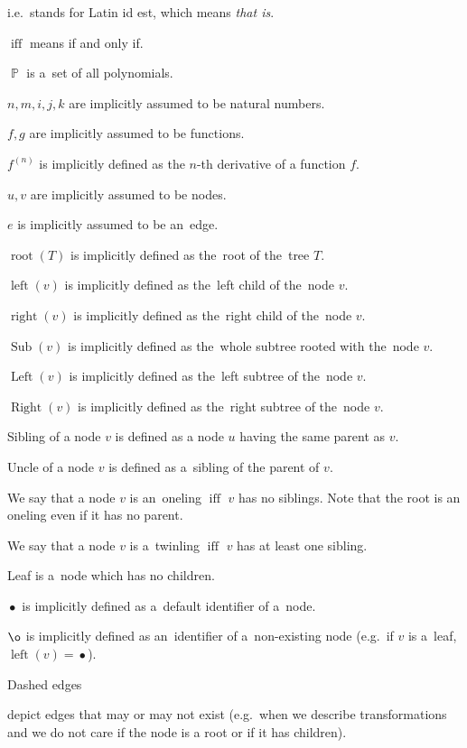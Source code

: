 \documentclass[final]{article}
\theoremstyle{definition}
\theoremstyle{definition}
\theoremstyle{remark}
\DeclareMathOperator{\textiff}{\text{iff}}
\DeclareMathOperator{\poly}{\mathbb{P}}
\DeclareMathOperator{\troot}{\text{root}}
\DeclareMathOperator{\tleft}{\text{left}}
\DeclareMathOperator{\tright}{\text{right}}
\DeclareMathOperator{\tLeft}{\text{Left}}
\DeclareMathOperator{\tRight}{\text{Right}}
\DeclareMathOperator{\tSub}{\text{Sub}}
\DeclareMathOperator{\n}{\bullet}
\DeclareMathOperator{\no}{\o}
\begin{document}
i.e.~stands for Latin id est, which means \textit{that is}.

\(\textiff\) means if and only if.

\(\poly\) is a~set of all polynomials.

\(n, m, i, j, k\) are implicitly assumed to be natural numbers.

\(f, g\) are implicitly assumed to be functions.

\(f^{(n)}\) is implicitly defined as the \(n\)-th derivative of a function \(f\).

\(u, v\) are implicitly assumed to be nodes.

\(e\) is implicitly assumed to be an~edge.

\(\troot(T)\) is implicitly defined as the~root of the~tree \(T\).

\(\tleft(v)\) is implicitly defined as the~left child of the~node \(v\).

\(\tright(v)\) is implicitly defined as the~right child of the~node \(v\).

\(\tSub(v)\) is implicitly defined as the~whole subtree rooted with the~node \(v\).

\(\tLeft(v)\) is implicitly defined as the~left subtree of the~node \(v\).

\(\tRight(v)\) is implicitly defined as the~right subtree of the~node \(v\).

Sibling of a node \(v\) is defined as a node \(u\) having the same parent as \(v\).

Uncle of a node \(v\) is defined as a~sibling of the parent of \(v\).

We say that a node \(v\) is an~oneling \(\textiff\) \(v\) has no siblings. Note that the root is an oneling even if it has no parent.

We say that a node \(v\) is a~twinling \(\textiff\) \(v\) has at least one sibling.

Leaf is a~node which has no children.

\(\n\) is implicitly defined as a~default identifier of a~node.

\(\no\) is implicitly defined as an~identifier of a~non-existing node (e.g.~if \(v\) is a~leaf, \(\tleft(v) = \n\)).

Dashed edges 
\begin{minipage}{1.5em}

\end{minipage}
depict edges that may or may not exist (e.g.~when we describe transformations and we do not care if the node is a root or if it has children).
\end{document}
